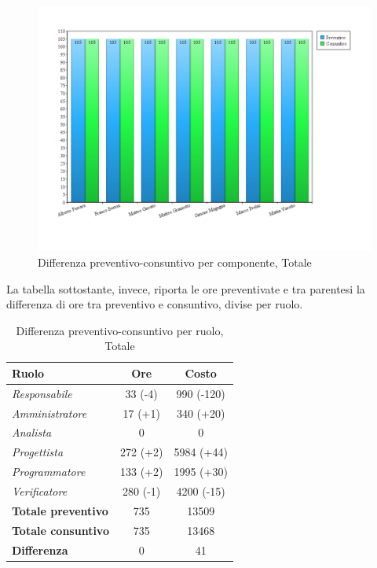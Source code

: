 \begin{figure}[H]
	\centering
	\includegraphics[scale=0.4]{immagini/Grafi/Totale_oreComponente.png}
	\caption{Differenza preventivo-consuntivo per componente, Totale}
\end{figure}
\FloatBarrier

\newpage
La tabella sottostante, invece, riporta le ore preventivate e  tra parentesi la differenza di ore tra preventivo e consuntivo, divise per ruolo.

\begin{table}[H]
	\begin{center}
		\begin{tabular}{|l|c|c|}
			\hline
			\textbf{Ruolo}	& \textbf{Ore} & \textbf{Costo} 					\\
			\hline
			\textit{Responsabile}		&	33 (-4)			&	990	(-120)		\\
			\hline
			\textit{Amministratore}		&	17	(+1)		&	340	(+20)		\\
			\hline
			\textit{Analista}			&	0				&	0				\\
			\hline
			\textit{Progettista}		&	272	(+2)		&	5984 (+44)		\\
			\hline
			\textit{Programmatore}		&	133	(+2)		&	1995 (+30)		\\
			\hline
			\textit{Verificatore}		&	280	(-1)		&	4200 (-15)		\\
			\hline	
			\textbf{Totale preventivo}	&	735				& 	13509			\\
			\hline
			\textbf{Totale consuntivo}	&	735				&  	13468			\\
			\hline
			\textbf{Differenza} 		&	0				&	41				\\
			\hline
		\end{tabular}
	\end{center}
	\caption{Differenza preventivo-consuntivo per ruolo, Totale}
\end{table}

